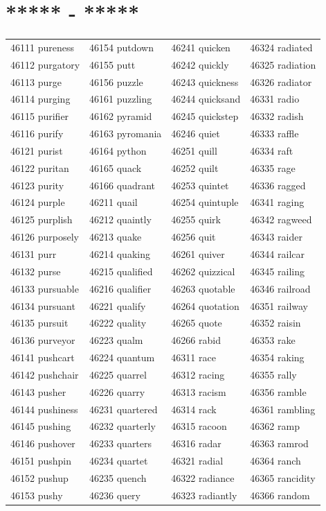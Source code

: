 \documentclass[10pt, oneside]{book}
\begin{document}
\begin{table}[h]
	\centering
	\section*{***** - *****}
	\begin{tabular}{l l l l}
46111 pureness &46154 putdown &46241 quicken &46324 radiated\\
46112 purgatory &46155 putt &46242 quickly &46325 radiation\\
46113 purge &46156 puzzle &46243 quickness &46326 radiator\\
46114 purging &46161 puzzling &46244 quicksand &46331 radio\\
46115 purifier &46162 pyramid &46245 quickstep &46332 radish\\
46116 purify &46163 pyromania &46246 quiet &46333 raffle\\
46121 purist &46164 python &46251 quill &46334 raft\\
46122 puritan &46165 quack &46252 quilt &46335 rage\\
46123 purity &46166 quadrant &46253 quintet &46336 ragged\\
46124 purple &46211 quail &46254 quintuple &46341 raging\\
46125 purplish &46212 quaintly &46255 quirk &46342 ragweed\\
46126 purposely &46213 quake &46256 quit &46343 raider\\
46131 purr &46214 quaking &46261 quiver &46344 railcar\\
46132 purse &46215 qualified &46262 quizzical &46345 railing\\
46133 pursuable &46216 qualifier &46263 quotable &46346 railroad\\
46134 pursuant &46221 qualify &46264 quotation &46351 railway\\
46135 pursuit &46222 quality &46265 quote &46352 raisin\\
46136 purveyor &46223 qualm &46266 rabid &46353 rake\\
46141 pushcart &46224 quantum &46311 race &46354 raking\\
46142 pushchair &46225 quarrel &46312 racing &46355 rally\\
46143 pusher &46226 quarry &46313 racism &46356 ramble\\
46144 pushiness &46231 quartered &46314 rack &46361 rambling\\
46145 pushing &46232 quarterly &46315 racoon &46362 ramp\\
46146 pushover &46233 quarters &46316 radar &46363 ramrod\\
46151 pushpin &46234 quartet &46321 radial &46364 ranch\\
46152 pushup &46235 quench &46322 radiance &46365 rancidity\\
46153 pushy &46236 query &46323 radiantly &46366 random\\
	\end{tabular}
 \end{table}
\end{document}
